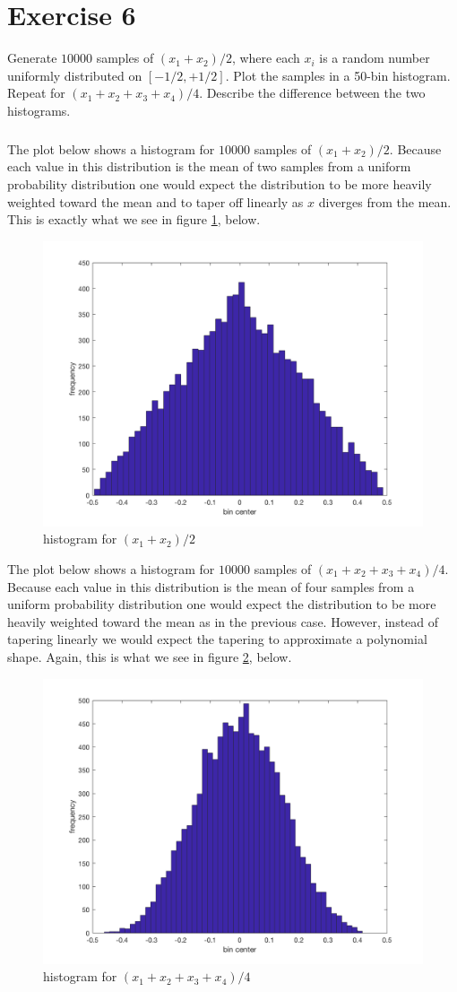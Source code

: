 \documentclass[11pt]{article}
\begin{document}
\section*{Exercise 6}
Generate $10000$ samples of $(x_1+x_2)/2$, where each $x_i$ is a random number uniformly distributed on $[-1/2,+1/2]$. Plot the samples in a 50-bin histogram. Repeat for $(x_1+x_2+x_3+x_4)/4$. Describe the difference between the two histograms.

\subparagraph*{}
The plot below shows a histogram for $10000$ samples of $(x_1 + x_2)/2$. Because each value in this distribution is the mean of two samples from a uniform probability distribution one would expect the distribution to be more heavily weighted toward the mean and to taper off linearly as $x$ diverges from the mean. This is exactly what we see in figure \ref{6_plot1}, below.
\begin{figure}[h!]
	\centering
	\includegraphics[width=0.6\linewidth]{6_plot1.png}
	\caption{histogram for $(x_1 + x_2)/2$}
	\label{6_plot1}
\end{figure}

The plot below shows a histogram for $10000$ samples of $(x_1 + x_2 + x_3 + x_4)/4$. Because each value in this distribution is the mean of four samples from a uniform probability distribution one would expect the distribution to be more heavily weighted toward the mean as in the previous case. However, instead of tapering linearly we would expect the tapering to approximate a polynomial shape. Again, this is what we see in figure \ref{6_plot2}, below.
\begin{figure}[h!]
	\centering
	\includegraphics[width=0.6\linewidth]{6_plot2.png}
	\caption{histogram for $(x_1 + x_2 + x_3 + x_4)/4$}
	\label{6_plot2}
\end{figure}
\end{document}
